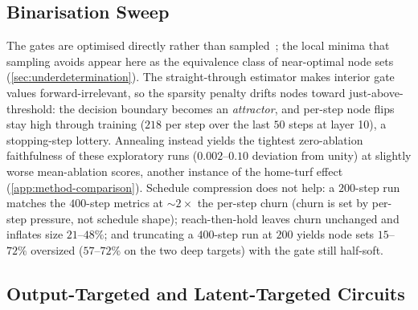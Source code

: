 \documentclass[10pt]{article}
\begin{document}
\subsection{Binarisation Sweep}
The gates are optimised directly rather than sampled~\citep{louizos2018learning, li2024optimal}; the local minima that sampling avoids appear here as the equivalence class of near-optimal node sets (\cref{sec:underdetermination}).
The straight-through estimator makes interior gate values forward-irrelevant, so the sparsity penalty drifts nodes toward just-above-threshold: the decision boundary becomes an \emph{attractor}, and per-step node flips stay high through training ($218$ per step over the last $50$ steps at layer 10), a stopping-step lottery.
Annealing instead yields the tightest zero-ablation faithfulness of these exploratory runs ($0.002$--$0.10$ deviation from unity) at slightly worse mean-ablation scores, another instance of the home-turf effect (\cref{app:method-comparison}).
Schedule compression does not help: a $200$-step run matches the $400$-step metrics at ${\sim}2\times$ the per-step churn (churn is set by per-step pressure, not schedule shape); reach-then-hold leaves churn unchanged and inflates size $21$--$48\%$; and truncating a $400$-step run at $200$ yields node sets $15$--$72\%$ oversized ($57$--$72\%$ on the two deep targets) with the gate still half-soft.

\subsection{Output-Targeted and Latent-Targeted Circuits}
\label{app:secondary}
\end{document}
